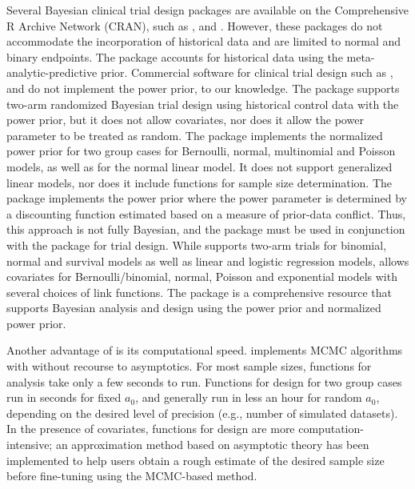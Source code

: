 Several Bayesian clinical trial design packages are available on the Comprehensive R Archive Network (CRAN), such as ,  and  \citep{BDP2, ph2bayes, gsbDesign}. However, these packages do not accommodate the incorporation of historical data and are limited to normal and binary endpoints. The  package \citep{RBesT} accounts for historical data using the meta-analytic-predictive prior. Commercial software for clinical trial design such as ,  and  \citep{FACTS, East, ADDPLAN} do not implement the power prior, to our knowledge.  The  \citep{BayesCTDesign} package supports two-arm randomized Bayesian trial design using historical control data with the power prior, but it does not allow covariates, nor does it allow the power parameter to be treated as random.  The  \citep{NPP} package implements the normalized power prior for two group cases for Bernoulli, normal, multinomial and Poisson models, as well as for the normal linear model. It does not support generalized linear models, nor does it include functions for sample size determination. The  \citep{bayesDP} package implements the power prior where the power parameter is determined by a discounting function estimated based on a measure of prior-data conflict. Thus, this approach is not fully Bayesian, and the package must be used in conjunction with the package  \citep{bayesCT} for trial design. While  supports two-arm trials for binomial, normal and survival models as well as linear and logistic regression models,  allows covariates for Bernoulli/binomial, normal, Poisson and exponential models with several choices of link functions. The  package is a comprehensive resource that supports Bayesian analysis and design using the power prior and normalized power prior.

Another advantage of  is its computational speed.   implements MCMC algorithms with  \citep{Rcpp} without recourse to asymptotics. For most sample sizes, functions for analysis take only a few seconds to run. Functions for design for two group cases run in seconds for fixed $a_0$, and generally run in less an hour for random $a_0$, depending on the desired level of precision (e.g., number of simulated datasets). In the presence of covariates, functions for design are more computation-intensive; an approximation method based on asymptotic theory has been implemented to help users obtain a rough estimate of the desired sample size before fine-tuning using the MCMC-based method. 

